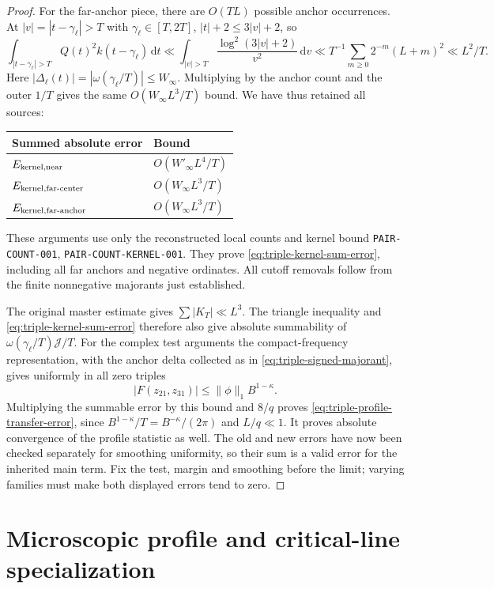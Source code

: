 \documentclass[11pt]{article}
\newcommand{\dd}{\,\mathrm d}
\begin{document}
\begin{proof}
For the far-anchor piece, there are \(O(TL)\) possible anchor
occurrences. At \(|v|=|t-\gamma_\ell|>T\) with
\(\gamma_\ell\in[T,2T]\), \(|t|+2\leq3|v|+2\), so
\[
 \int_{|t-\gamma_\ell|>T}Q(t)^2k(t-\gamma_\ell)\dd t
 \ll\int_{|v|>T}\frac{\log^2(3|v|+2)}{v^2}\dd v
 \ll T^{-1}\sum_{m\geq0}2^{-m}(L+m)^2\ll L^2/T.
\]
Here \(|\Delta_\ell(t)|=|\omega(\gamma_\ell/T)|\leq W_\infty\).
Multiplying by the anchor count and the outer \(1/T\) gives the same
\(O(W_\infty L^3/T)\) bound. We have thus retained all sources:
\begin{center}
\begin{tabular}{ll}
\toprule
Summed absolute error & Bound\\
\midrule
\(E_{\rm kernel,near}\) & \(O(W'_{\infty}L^4/T)\)\\
\(E_{\rm kernel,far\text{-}center}\) & \(O(W_\infty L^3/T)\)\\
\(E_{\rm kernel,far\text{-}anchor}\) & \(O(W_\infty L^3/T)\)\\
\bottomrule
\end{tabular}
\end{center}
These arguments use only the reconstructed local counts and kernel
bound \texttt{PAIR-COUNT-001}, \texttt{PAIR-COUNT-KERNEL-001}.
They prove \eqref{eq:triple-kernel-sum-error}, including all far anchors
and negative ordinates. All cutoff removals follow from the finite
nonnegative majorants just established.

The original master estimate gives \(\sum|K_T|\ll L^3\).
The triangle inequality and \eqref{eq:triple-kernel-sum-error} therefore
also give absolute summability of
\(\omega(\gamma_\ell/T)\mathcal J/T\).
For the complex test arguments the compact-frequency representation,
with the anchor delta collected as in
\eqref{eq:triple-signed-majorant}, gives uniformly in all zero triples
\[
 |F(z_{21},z_{31})|\leq\|\phi\|_1 B^{1-\kappa}.
\]
Multiplying the summable error by this bound and \(8/q\) proves
\eqref{eq:triple-profile-transfer-error}, since
\(B^{1-\kappa}/T=B^{-\kappa}/(2\pi)\) and \(L/q\ll1\).
It proves absolute convergence of the profile statistic as well.
The old and new errors have now been checked separately for smoothing
uniformity, so their sum is a valid error for the inherited main term.
Fix the test, margin and smoothing before the limit; varying families
must make both displayed errors tend to zero.
\end{proof}

\section{Microscopic profile and critical-line specialization}
\end{document}
